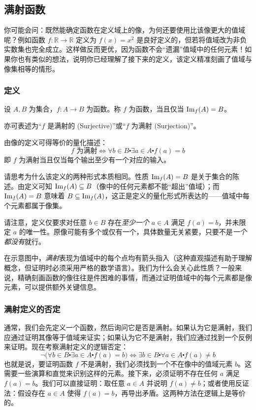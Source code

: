 
\subsection{满射函数}

你可能会问：既然能确定函数在定义域上的像，为何还要使用比该像更大的值域呢？例如函数 $f : \mathbb{R} \to \mathbb{R}$ 定义为 $f(x) = x^2$ 是良好定义的，但若将值域改为非负实数集也完全成立。这样做反而更优，因为函数不会``遗漏''值域中的任何元素！如果你也有类似的想法，说明你已经理解了接下来的定义，该定义精准刻画了值域与像集相等的情形。

\subsubsection*{定义}

\begin{definition}
    设 $A,B$ 为集合，$f:A \to B$ 为函数。称 $f$ 为函数，当且仅当 $\text{Im}_f(A) = B$。

    亦可表述为``$f$ 是满射的 (Surjective)''或``$f$ 为满射 (Surjection)''。

    由像的定义可得等价的量化描述：
    \[f \text{\ 为满射} \iff \forall b \in B \centerdot \exists a \in A \centerdot f(a) = b\]
    即 $f$ 为满射当且仅当每个输出至少有一个对应的输入。
\end{definition}

请思考为什么该定义的两种形式本质相同。性质 $\text{Im}_f (A) = B$ 是关于集合的陈述。由定义可知 $\text{Im}_f (A) \subseteq B$（像中的任何元素都不能``超出''值域）；而 $\text{Im}_f (A) = B$ 意味着 $B \subseteq \text{Im}_f (A)$，这正是定义的量化形式所表达的——值域中每个元素都属于像集。

请注意，定义仅要求对任意 $b \in B$ 存在\emph{至少一个} $a \in A$ 满足 $f(a) = b$，并未限定 $a$ 的唯一性。原像可能有多个或仅有一个，具体数量无关紧要，只要不是\emph{一个都没有}就行。

在示意图中，\emph{满射}表现为值域中的每个点均有箭头指入（这种直观描述有助于理解概念，但证明时必须采用严格的数学语言）。我们为什么会关心此性质？一般来说，精确刻画函数的像往往是件困难的事情，而通过证明值域中的每个元素都是像元素，可以提供额外关键信息。

\subsubsection*{满射定义的否定}

通常，我们会先定义一个函数，然后询问它是否是满射。如果认为它是满射，我们应通过证明其像等于值域来证实；如果认为它不是满射，我们应通过找到一个反例来证明。现在考察满射定义的逻辑否定：
\[\neg \big(\forall b \in B \centerdot \exists a \in A \centerdot f(a) = b \big) \iff \exists b \in B \centerdot \forall a \in A \centerdot f(a) \ne b\]
也就是说，要证明函数 $f$ 不是满射，我们必须找到一个不在像中的值域元素 $b$。这需要一些演算和直觉来识别这样的元素。接下来，必须证明不存在任何 $a$ 满足 $f(a) = b$。我们可以直接证明：取任意 $a \in A$ 并说明 $f(a) \ne b$；或者使用反证法：假设存在 $a \in A$ 使得 $f(a) = b$，再导出矛盾。这两种方法在逻辑上是等价的。

